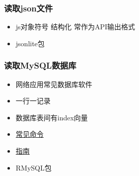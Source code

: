 \documentclass[]{book}
\newenvironment{Shaded}{\begin{snugshade}}{\end{snugshade}}
\newcommand{\CommentTok}[1]{\textcolor[rgb]{0.56,0.35,0.01}{\textit{#1}}}
\newcommand{\DataTypeTok}[1]{\textcolor[rgb]{0.13,0.29,0.53}{#1}}
\newcommand{\KeywordTok}[1]{\textcolor[rgb]{0.13,0.29,0.53}{\textbf{#1}}}
\newcommand{\NormalTok}[1]{#1}
\newcommand{\OperatorTok}[1]{\textcolor[rgb]{0.81,0.36,0.00}{\textbf{#1}}}
\newcommand{\OtherTok}[1]{\textcolor[rgb]{0.56,0.35,0.01}{#1}}
\newcommand{\StringTok}[1]{\textcolor[rgb]{0.31,0.60,0.02}{#1}}
\providecommand{\tightlist}{%
  \setlength{\itemsep}{0pt}\setlength{\parskip}{0pt}}
\begin{document}
\hypertarget{json}{%
\subsubsection{读取json文件}\label{json}}

\begin{itemize}
\tightlist
\item
  js对象符号 结构化 常作为API输出格式
\item
  jsonlite包
\end{itemize}

\begin{Shaded}
\end{Shaded}

\hypertarget{mysql}{%
\subsubsection{读取MySQL数据库}\label{mysql}}

\begin{itemize}
\tightlist
\item
  网络应用常见数据库软件
\item
  一行一记录
\item
  数据库表间有index向量
\item
  \href{http://www.pantz.org/software/mysql/mysqlcommands.html}{常见命令}
\item
  \href{http://www.r-bloggers.com/mysql-and-r/}{指南}
\item
  RMySQL包
\end{itemize}
\end{document}
